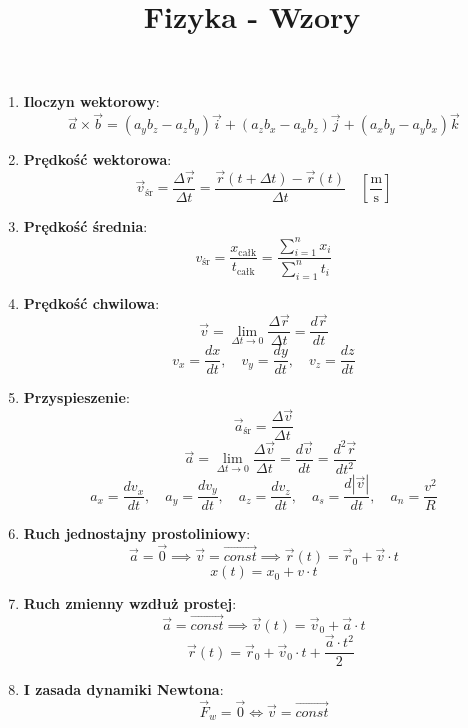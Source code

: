 \documentclass{article}
\author{}
\title{Fizyka - Wzory}
\date{}
\begin{document}
	\maketitle
	
	\begin{enumerate}
		
		\item \textbf{Iloczyn wektorowy}:
		\[
		\vec{a} \times \vec{b} = (a_yb_z - a_zb_y)\vec{i} + (a_zb_x - a_xb_z)\vec{j} + (a_xb_y - a_yb_x)\vec{k}
		\]
		
		\item \textbf{Prędkość wektorowa}:
		\[
		\vec{v}_\text{śr} = \frac{\Delta\vec{r}}{\Delta t} = \frac{\vec{r}(t + \Delta t) - \vec{r}(t)}{\Delta t} \quad \left[\frac{\text{m}}{\text{s}}\right]
		\]
		
		\item \textbf{Prędkość średnia}:
		\[
		v_\text{śr} = \frac{x_\text{całk}}{t_\text{całk}} = \frac{\sum \limits_{i=1}^{n}x_i}{\sum \limits_{i=1}^{n}t_i}
		\]
		
		\item \textbf{Prędkość chwilowa}:
		\[
		\vec{v} = \lim_{\Delta t \to 0} \frac{\Delta \vec{r}}{\Delta t} = \frac{d \vec{r}}{dt}
		\]
		\[
		v_x = \frac{dx}{dt}, \quad v_y = \frac{dy}{dt}, \quad v_z = \frac{dz}{dt}
		\]
		
		\item \textbf{Przyspieszenie}:
		\[
		\vec{a}_\text{śr} = \frac{\Delta \vec{v}}{\Delta t}
		\]
		\[
		\quad 
		\vec{a} = \lim_{\Delta t \to 0} \frac{\Delta \vec{v}}{\Delta t} = \frac{d \vec{v}}{dt} = \frac{d^2 \vec{r}}{dt^2}
		\]
		\[
		a_x = \frac{dv_x}{dt}, \quad a_y = \frac{dv_y}{dt}, \quad a_z = \frac{dv_z}{dt}, \quad a_s = \frac{d|\vec{v}|}{dt}, \quad a_n = \frac{v^2}{R}
		\]
		
		\item \textbf{Ruch jednostajny prostoliniowy}:
			\[
			\vec{a} = \vec{0} \implies \vec{v} = \overrightarrow{const} \implies \vec{r}(t) = \vec{r}_0 + \vec{v} \cdot t
			\]
			\[
			x(t) = x_0 + v \cdot t
			\]
		
		\item \textbf{Ruch zmienny wzdłuż prostej}:
		\[
		\vec{a} = \overrightarrow{const} \implies \vec{v}(t) = \vec{v}_0 + \vec{a} \cdot t
		\]
		\[\quad \vec{r}(t) = \vec{r}_0 + \vec{v}_0 \cdot t + \frac{\vec{a} \cdot t^2}{2}
		\]
		
		\item \textbf{I zasada dynamiki Newtona}:
		\[
		\vec{F}_w = \vec{0} \iff \vec{v} = \overrightarrow{const}
		\]
		

\end{enumerate}
\end{document}
